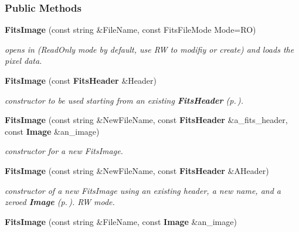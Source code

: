 \subsubsection*{Public Methods}
\begin{CompactItemize}
\item 
{}
{\bf Fits\-Image} (const string \&File\-Name, const Fits\-File\-Mode Mode=RO)\label{class_fitsimage_a0}

\begin{CompactList}\small\item\em opens in (Read\-Only mode by default, use RW to modifiy or create) and loads the pixel data.\item\end{CompactList}\item 
{}
{\bf Fits\-Image} (const {\bf Fits\-Header} \&Header)\label{class_fitsimage_a1}

\begin{CompactList}\small\item\em constructor to be used starting from an existing {\bf Fits\-Header} {\rm (p.\,\pageref{class_fitsheader})}.\item\end{CompactList}\item 
{\bf Fits\-Image} (const string \&New\-File\-Name, const {\bf Fits\-Header} \&a\_\-fits\_\-header, const {\bf Image} \&an\_\-image)
\begin{CompactList}\small\item\em constructor for a new Fits\-Image.\item\end{CompactList}\item 
{}
{\bf Fits\-Image} (const string \&New\-File\-Name, const {\bf Fits\-Header} \&AHeader)\label{class_fitsimage_a3}

\begin{CompactList}\small\item\em constructor of a new Fits\-Image using an existing header, a new name, and a zeroed {\bf Image} {\rm (p.\,\pageref{class_image})}. RW mode.\item\end{CompactList}\item 
{}
{\bf Fits\-Image} (const string \&File\-Name, const {\bf Image} \&an\_\-image)\label{class_fitsimage_a4}


\end{CompactItemize}
